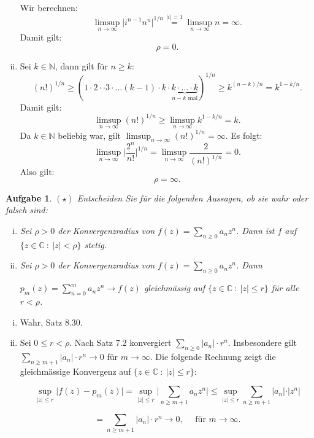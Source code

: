 \documentclass[a4paper, 20]{exam}
\newtheorem{ex}{Aufgabe}
\newcommand\CC{\mathbb{C}}
\newcommand\NN{\mathbb{N}}
\begin{document}
\begin{solution}
\begin{enumerate}[i.)]
Wir berechnen:
$$\limsup_{n \rightarrow \infty} \vert i^{n-1}n^n \vert^{1/n}  
\stackrel{\vert i \vert = 1}{=} \limsup_{n \rightarrow \infty} n = \infty.$$
Damit gilt:
$$\rho = 0.$$
\item
Sei $k\in \NN$, dann gilt f\"ur $n\geq k$:
$$ \left( n! \right)^{1/n} 
\geq \left(1\cdot 2 \cdot \cdot 3 \cdot \dots (k-1) \cdot k \cdot \underbrace{k \cdot \dots \cdot k}_{n-k \text{ mal}} \right)^{1/n}
\geq k^{(n-k)/n} = k^{1- k/n}.$$
Damit gilt:
$$ \limsup_{n\rightarrow \infty} (n!)^{1/n} \geq \limsup_{n\rightarrow \infty} k^{1- k/n} = k.$$
Da $k\in \NN$ beliebig war, gilt $\limsup_{n\rightarrow \infty} (n!)^{1/n}= \infty$. Es folgt:
$$ \limsup_{n \rightarrow \infty} \bigg\vert \frac{2^n}{n!} \bigg\vert^{1/n}
= \limsup_{n \rightarrow \infty} \frac{2}{(n!)^{1/n}} =0.$$
Also gilt:
$$ \rho= \infty. $$
\end{enumerate}
\end{solution}


\begin{ex}{$(\star)$}
Entscheiden Sie f\"ur die folgenden Aussagen, ob sie wahr oder falsch sind:
\begin{enumerate}[i.)]
\item
Sei $\rho>0$ der Konvergenzradius von $f(z)= \sum_{n\geq 0} a_n z^n$. Dann ist $f$ auf
$\{ z \in \CC \ : \ \vert z \vert < \rho  \}$ stetig.
\item
Sei $\rho>0$ der Konvergenzradius von $f(z)= \sum_{n\geq 0} a_n z^n$. Dann

$p_m(z)= \sum_{n=0}^m a_n z^n \longrightarrow f(z)$ gleichm\"assig auf $\{ z \in \CC \ : \ \vert z \vert \leq r  \}$ f\"ur alle $r<\rho$.
\end{enumerate}
\end{ex}
\begin{solution}
\begin{enumerate}[i.)]
\item
Wahr, Satz 8.30.
\item
Sei $0\leq r < \rho$. Nach Satz 7.2 konvergiert $\sum_{n\geq 0} \vert a_n \vert \cdot r^n$. Insbesondere gilt $\sum_{n\geq m+1} \vert a_n \vert \cdot r^n \longrightarrow 0$ f\"ur $m\longrightarrow \infty$. Die folgende Rechnung zeigt die gleichm\"assige Konvergenz auf $\{ z \in \CC \ : \ \vert z \vert \leq r  \}$:

$$ \sup_{\vert z \vert \leq r} \vert f(z) - p_m(z) \vert 
= \sup_{\vert z \vert \leq r} \vert \sum_{n\geq m+1} a_n z^n \vert
\leq \sup_{\vert z \vert \leq r}  \sum_{n\geq m+1} \vert a_n \vert \cdot \vert z^n \vert$$

$$= \sum_{n\geq m+1} \vert a_n \vert \cdot r^n \longrightarrow 0, \quad \text{ f\"ur } m \longrightarrow \infty.$$

\end{enumerate}
\end{solution}
\end{document}
